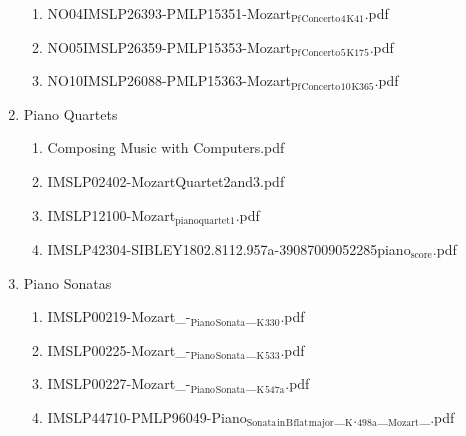 \documentclass[11pt]{article}
\begin{document}
\begin{enumerate}
\begin{enumerate}
\item NO04IMSLP26393-PMLP15351-Mozart$_{\text{Pf}}$$_{\text{Concerto}}$$_{\text{4}}$$_{\text{K41}}$.pdf
\label{sec-1-1-1-1-44-49-4-31}

\item NO05IMSLP26359-PMLP15353-Mozart$_{\text{Pf}}$$_{\text{Concerto}}$$_{\text{5}}$$_{\text{K175}}$.pdf
\label{sec-1-1-1-1-44-49-4-32}

\item NO10IMSLP26088-PMLP15363-Mozart$_{\text{Pf}}$$_{\text{Concerto}}$$_{\text{10}}$$_{\text{K365}}$.pdf
\label{sec-1-1-1-1-44-49-4-33}
\end{enumerate}

\item Piano Quartets
\label{sec-1-1-1-1-44-49-5}
\begin{enumerate}
\item Composing Music with Computers.pdf
\label{sec-1-1-1-1-44-49-5-1}

\item IMSLP02402-MozartQuartet2and3.pdf
\label{sec-1-1-1-1-44-49-5-2}

\item IMSLP12100-Mozart$_{\text{pianoquartet1}}$.pdf
\label{sec-1-1-1-1-44-49-5-3}

\item IMSLP42304-SIBLEY1802.8112.957a-39087009052285piano$_{\text{score}}$.pdf
\label{sec-1-1-1-1-44-49-5-4}
\end{enumerate}

\item Piano Sonatas
\label{sec-1-1-1-1-44-49-6}
\begin{enumerate}
\item IMSLP00219-Mozart\_-$_{\text{Piano}}$$_{\text{Sonata}}$\_$_{\text{K}}$$_{\text{330}}$.pdf
\label{sec-1-1-1-1-44-49-6-1}

\item IMSLP00225-Mozart\_-$_{\text{Piano}}$$_{\text{Sonata}}$\_$_{\text{K}}$$_{\text{533}}$.pdf
\label{sec-1-1-1-1-44-49-6-2}

\item IMSLP00227-Mozart\_-$_{\text{Piano}}$$_{\text{Sonata}}$\_$_{\text{K}}$$_{\text{547a}}$.pdf
\label{sec-1-1-1-1-44-49-6-3}

\item IMSLP44710-PMLP96049-Piano$_{\text{Sonata}}$$_{\text{in}}$$_{\text{B}}$$_{\text{flat}}$$_{\text{major}}$\_$_{\text{K}}$.$_{\text{498a}}$\_$_{\text{Mozart}}$\_.pdf
\label{sec-1-1-1-1-44-49-6-4}


\end{enumerate}
\end{enumerate}
\end{document}
